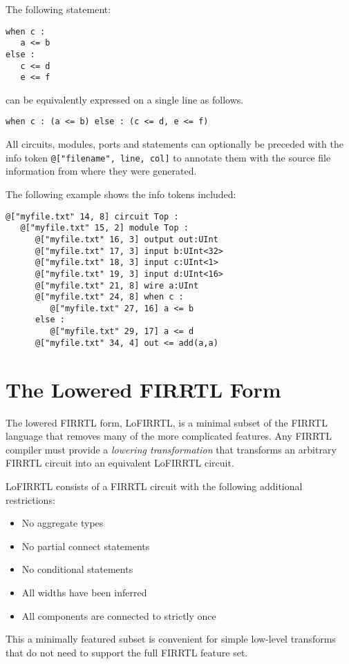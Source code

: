 \documentclass[12pt]{article}
\begin{document}
The following statement:
\begin{verbatim}
when c :
   a <= b
else :
   c <= d
   e <= f   
\end{verbatim}
can be equivalently expressed on a single line as follows.
\begin{verbatim}
when c : (a <= b) else : (c <= d, e <= f)
\end{verbatim}

All circuits, modules, ports and statements can optionally be preceded with the info token \verb|@["filename", line, col]| to annotate them with the source file information from where they were generated.

The following example shows the info tokens included:

\begin{verbatim}
@["myfile.txt" 14, 8] circuit Top :
   @["myfile.txt" 15, 2] module Top :
      @["myfile.txt" 16, 3] output out:UInt
      @["myfile.txt" 17, 3] input b:UInt<32>
      @["myfile.txt" 18, 3] input c:UInt<1>
      @["myfile.txt" 19, 3] input d:UInt<16>
      @["myfile.txt" 21, 8] wire a:UInt
      @["myfile.txt" 24, 8] when c :
         @["myfile.txt" 27, 16] a <= b
      else :
         @["myfile.txt" 29, 17] a <= d
      @["myfile.txt" 34, 4] out <= add(a,a)   
\end{verbatim}

\section{The Lowered FIRRTL Form}

The lowered FIRRTL form, LoFIRRTL, is a minimal subset of the FIRRTL language that removes many of the more complicated features. Any FIRRTL compiler must provide a {\em lowering transformation} that transforms an arbitrary FIRRTL circuit into an equivalent LoFIRRTL circuit.

LoFIRRTL consists of a FIRRTL circuit with the following additional restrictions:
\begin{itemize}
\item No aggregate types
\item No partial connect statements
\item No conditional statements
\item All widths have been inferred
\item All components are connected to strictly once
\end{itemize}

This a minimally featured subset is convenient for simple low-level transforms that do not need to support the full FIRRTL feature set.
\end{document}
